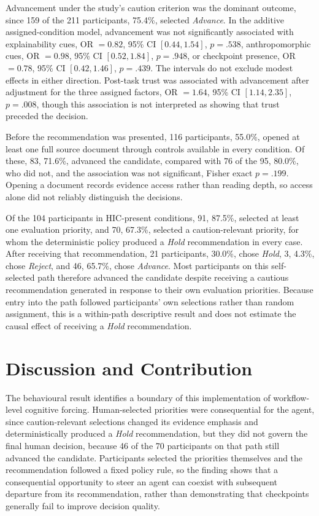 Advancement under the study's caution criterion was the dominant outcome,
since 159 of the 211 participants, 75.4\%, selected \emph{Advance}. In the
additive assigned-condition model, advancement was not significantly
associated with explainability cues, OR $=0.82$, 95\% CI $[0.44, 1.54]$,
$p=.538$, anthropomorphic cues, OR $=0.98$, 95\% CI $[0.52, 1.84]$,
$p=.948$, or checkpoint presence, OR $=0.78$, 95\% CI $[0.42, 1.46]$,
$p=.439$. The intervals do not exclude modest effects in either direction.
Post-task trust was associated with advancement after adjustment for the
three assigned factors, OR $=1.64$, 95\% CI $[1.14, 2.35]$, $p=.008$,
though this association is not interpreted as showing that trust preceded
the decision.

Before the recommendation was presented, 116 participants, 55.0\%, opened
at least one full source document through controls available in every
condition. Of these, 83, 71.6\%, advanced the candidate, compared with 76
of the 95, 80.0\%, who did not, and the association was not significant,
Fisher exact $p=.199$. Opening a document records evidence access rather
than reading depth, so access alone did not reliably distinguish the
decisions.

Of the 104 participants in HIC-present conditions, 91, 87.5\%, selected at
least one evaluation priority, and 70, 67.3\%, selected a caution-relevant
priority, for whom the deterministic policy produced a \emph{Hold}
recommendation in every case. After receiving that recommendation, 21
participants, 30.0\%, chose \emph{Hold}, 3, 4.3\%, chose \emph{Reject}, and
46, 65.7\%, chose \emph{Advance}. Most participants on this self-selected
path therefore advanced the candidate despite receiving a cautious
recommendation generated in response to their own evaluation priorities.
Because entry into the path followed participants' own selections rather
than random assignment, this is a within-path descriptive result and does
not estimate the causal effect of receiving a \emph{Hold} recommendation.

\section{Discussion and Contribution}

The behavioural result identifies a boundary of this implementation of
workflow-level cognitive forcing. Human-selected priorities were
consequential for the agent, since caution-relevant selections changed its
evidence emphasis and deterministically produced a \emph{Hold}
recommendation, but they did not govern the final human decision, because
46 of the 70 participants on that path still advanced the candidate.
Participants selected the priorities themselves and the recommendation
followed a fixed policy rule, so the finding shows that a consequential
opportunity to steer an agent can coexist with subsequent departure from
its recommendation, rather than demonstrating that checkpoints generally
fail to improve decision quality.


